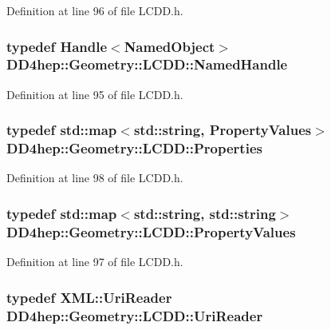 Definition at line 96 of file LCDD.h.\hypertarget{class_d_d4hep_1_1_geometry_1_1_l_c_d_d_a5502368683a5c78c91e9f814ff72b705}{
\subsubsection[{NamedHandle}]{\setlength{\rightskip}{0pt plus 5cm}typedef {\bf Handle}$<${\bf NamedObject}$>$ {\bf DD4hep::Geometry::LCDD::NamedHandle}}}
\label{class_d_d4hep_1_1_geometry_1_1_l_c_d_d_a5502368683a5c78c91e9f814ff72b705}


Definition at line 95 of file LCDD.h.\hypertarget{class_d_d4hep_1_1_geometry_1_1_l_c_d_d_a89096744868821bf5dcb0c0560b348c9}{
\subsubsection[{Properties}]{\setlength{\rightskip}{0pt plus 5cm}typedef std::map$<$std::string, {\bf PropertyValues}$>$ {\bf DD4hep::Geometry::LCDD::Properties}}}
\label{class_d_d4hep_1_1_geometry_1_1_l_c_d_d_a89096744868821bf5dcb0c0560b348c9}


Definition at line 98 of file LCDD.h.\hypertarget{class_d_d4hep_1_1_geometry_1_1_l_c_d_d_a2a0388e0d76c73a3582439953ac3be53}{
\subsubsection[{PropertyValues}]{\setlength{\rightskip}{0pt plus 5cm}typedef std::map$<$std::string, std::string$>$ {\bf DD4hep::Geometry::LCDD::PropertyValues}}}
\label{class_d_d4hep_1_1_geometry_1_1_l_c_d_d_a2a0388e0d76c73a3582439953ac3be53}


Definition at line 97 of file LCDD.h.\hypertarget{class_d_d4hep_1_1_geometry_1_1_l_c_d_d_a69f1e3e4fbcef1d57f1df1c2bd85918f}{
\subsubsection[{UriReader}]{\setlength{\rightskip}{0pt plus 5cm}typedef {\bf XML::UriReader} {\bf DD4hep::Geometry::LCDD::UriReader}}}
\label{class_d_d4hep_1_1_geometry_1_1_l_c_d_d_a69f1e3e4fbcef1d57f1df1c2bd85918f}


